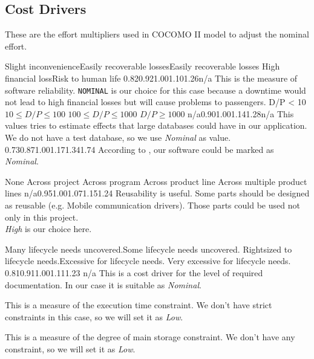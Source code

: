 \pagebreak
\subsection{Cost Drivers} %
These are the effort multipliers used in COCOMO II model to adjust the
nominal effort. 
\label{sub:cost_drivers}

{Slight inconvenience}{Easily recoverable losses}{Easily recoverable losses}
{High financial loss}{Risk to human life}{}
{0.82}{0.92}{1.00}{1.10}{1.26}{n/a} {
    This is the measure of software reliability. \texttt{NOMINAL} is our choice
    for this case because a downtime would not lead to high financial losses
    but will cause problems to passengers.
}
{ }{D/P < 10}{$ 10 \leq D/P \le 100 $}{ $ 100 \leq D/P \le 1000 $} { $ D/P \ge 1000 $ } { }
{n/a}{0.90}{1.00}{1.14}{1.28}{n/a}
{This values tries to estimate effects that large databases could have in our application.
    We do not have a test database, so we use \emph{Nominal} as value.
}
 { 0.73}{0.87}{1.00}{1.17}{1.34}{1.74} { 
    According to \cite[Table~20]{bib:cocomo2}, our software could be marked as \emph{Nominal}.
}

{ } { None } { Across project } { Across program } { Across product line} 
{Across multiple product lines} { n/a}{0.95}{1.00}{1.07}{1.15}{1.24} {
    Reusability is useful. Some parts should be designed as reusable (e.g.
    Mobile communication drivers). Those parts could be used not only in this project. \\
    \emph{High} is our choice here.
}

{Many life\-cycle needs uncovered.}{Some life\-cycle needs uncovered.}
{Right\-sized to life\-cycle needs.}{Excessive for life\-cycle needs.}
{Very excessive for life\-cycle needs.}{ } 
{0.81}{0.91}{1.00}{1.11}{1.23}{ n/a } { 
    This is a cost driver for the level of required documentation. 
    In our case it is suitable as \emph{Nominal}.
}

\pagebreak

 {
    This is a measure of the execution time constraint. We don't have strict constraints in this case, so we will set it as \emph{Low}.
}

 {
    This is a measure of the degree of main storage constraint. 
    We don't have any constraint, so we will set it as \emph{Low}.
}

